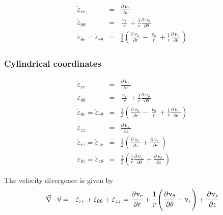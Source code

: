 \begin{eqnarray}
\dot\varepsilon_{rr} 
&=& \frac{\partial \upnu_r}{\partial r} \\
\dot\varepsilon_{\theta\theta} 
&=& \frac{\upnu_r}{r} + \frac{1}{r} \frac{\partial \upnu_\theta}{\partial \theta}  \\
\dot\varepsilon_{\theta r} = \dot\varepsilon_{r\theta} 
&=& \frac{1}{2} \left(   \frac{\partial \upnu_\theta}{\partial r} - \frac{\upnu_\theta}{r} 
+\frac{1}{r} \frac{\partial \upnu_r}{\partial \theta}  \right) 
\end{eqnarray}



\subsubsection{Cylindrical coordinates \label{ss:srcc}}

\begin{eqnarray}
\dot\varepsilon_{rr} 
&=& \frac{\partial \upnu_r}{\partial r} 
\\
\dot\varepsilon_{\theta\theta} 
&=& \frac{\upnu_r}{r} + \frac{1}{r} \frac{\partial \upnu_\theta}{\partial \theta}  
\\
\dot\varepsilon_{\theta r} = \dot\varepsilon_{r\theta} 
&=& \frac{1}{2} \left(   \frac{\partial \upnu_\theta}{\partial r} - \frac{\upnu_\theta}{r} 
+\frac{1}{r} \frac{\partial \upnu_r}{\partial \theta}  \right)
\\
\dot\varepsilon_{zz} 
&=& \frac{\partial \upnu_z}{\partial z} 
\\
\dot{\varepsilon}_{rz} = \dot{\varepsilon}_{zr} 
&=& \frac{1}{2}\left( \frac{\partial \upnu_r}{\partial z} + \frac{\partial \upnu_z}{\partial r}  \right) 
\\
\dot{\varepsilon}_{\theta z} = \dot{\varepsilon}_{z \theta} &=& \frac{1}{2}\left( 
\frac{1}{r} \frac{\partial \upnu_z}{\partial \theta} + \frac{\partial \upnu_\theta}{\partial z}  \right) 
\end{eqnarray}


The velocity divergence is given by
\begin{eqnarray}
\vec{\nabla}\cdot\vec\upnu 
&=& \dot{\varepsilon}_{rr} + \dot{\varepsilon}_{\theta\theta} + \dot{\varepsilon}_{zz} 
 = \cfrac{\partial \upnu_r}{\partial r} + \cfrac{1}{r}\left(\cfrac{\partial \upnu_\theta}{\partial \theta} 
+ \upnu_r \right)  + \cfrac{\partial \upnu_z}{\partial z}
\end{eqnarray} 



